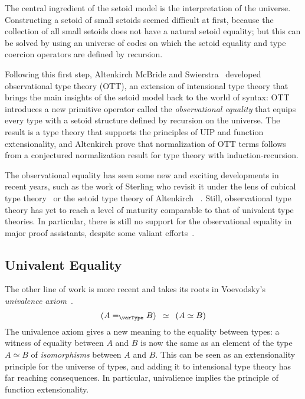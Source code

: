The central ingredient of the setoid model is the interpretation of the 
universe.
% 
Constructing a setoid of small setoids seemed difficult at first, because 
the collection of all small setoids does not have a natural setoid equality;
but this can be solved by using an 
universe of codes on which the setoid equality and type coercion operators are 
defined by recursion.

Following this first step, Altenkirch McBride and 
Swierstra~ developed observational 
type theory (OTT), an extension of intensional type theory that brings the main 
insights of the setoid model back to the world of syntax:
% 
OTT introduces a new primitive operator called the \emph{observational equality} that 
equips every type with a setoid structure defined by recursion on the universe.
% 
The result is a type theory that supports the principles of UIP and function 
extensionality, and Altenkirch \etal prove that normalization of OTT terms 
follows from a conjectured normalization result for type theory with 
induction-recursion.

The observational equality has seen some new and exciting developments in recent 
years, such as the work of Sterling \etal who revisit it under the lens of 
cubical type theory~ or the setoid
type theory of Altenkirch \etal~.
% 
Still, observational type theory has yet to reach a level of maturity 
comparable to that of univalent type theories.
% 
In particular, there is still no support for the observational equality in
major proof assistants, despite some valiant efforts~.

\subsection{Univalent Equality}

The other line of work is more recent and takes its roots in
Voevodsky's \emph{univalence axiom}~.
\[
(A =_{\varType} B) \enskip \simeq \enskip  (A \simeq B)
\]
The univalence axiom gives a new meaning to the equality between types: 
% 
% 
a witness of equality between \( A \) and \( B \) is now the same as an element of the type 
\( A \simeq B \) of \emph{isomorphisms} between \( A \) and \( B \). 
% 
This can be seen as an extensionality principle for the universe of types, and
adding it to intensional type theory has far reaching consequences. 
In particular, univalience implies the principle of function extensionality.

